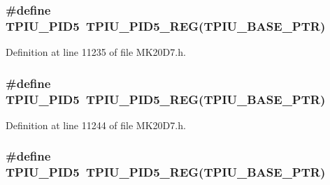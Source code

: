\subsubsection[{\texorpdfstring{T\+P\+I\+U\+\_\+\+P\+I\+D5}{TPIU_PID5}}]{\setlength{\rightskip}{0pt plus 5cm}\#define T\+P\+I\+U\+\_\+\+P\+I\+D5~{\bf T\+P\+I\+U\+\_\+\+P\+I\+D5\+\_\+\+R\+EG}({\bf T\+P\+I\+U\+\_\+\+B\+A\+S\+E\+\_\+\+P\+TR})}\hypertarget{group___t_p_i_u___register___accessor___macros_ga804c0eac6d089ad5451d954313339c37}{}\label{group___t_p_i_u___register___accessor___macros_ga804c0eac6d089ad5451d954313339c37}


Definition at line 11235 of file M\+K20\+D7.\+h.

\subsubsection[{\texorpdfstring{T\+P\+I\+U\+\_\+\+P\+I\+D5}{TPIU_PID5}}]{\setlength{\rightskip}{0pt plus 5cm}\#define T\+P\+I\+U\+\_\+\+P\+I\+D5~{\bf T\+P\+I\+U\+\_\+\+P\+I\+D5\+\_\+\+R\+EG}({\bf T\+P\+I\+U\+\_\+\+B\+A\+S\+E\+\_\+\+P\+TR})}\hypertarget{group___t_p_i_u___register___accessor___macros_ga804c0eac6d089ad5451d954313339c37}{}\label{group___t_p_i_u___register___accessor___macros_ga804c0eac6d089ad5451d954313339c37}


Definition at line 11244 of file M\+K20\+D7.\+h.

\subsubsection[{\texorpdfstring{T\+P\+I\+U\+\_\+\+P\+I\+D5}{TPIU_PID5}}]{\setlength{\rightskip}{0pt plus 5cm}\#define T\+P\+I\+U\+\_\+\+P\+I\+D5~{\bf T\+P\+I\+U\+\_\+\+P\+I\+D5\+\_\+\+R\+EG}({\bf T\+P\+I\+U\+\_\+\+B\+A\+S\+E\+\_\+\+P\+TR})}\hypertarget{group___t_p_i_u___register___accessor___macros_ga804c0eac6d089ad5451d954313339c37}{}\label{group___t_p_i_u___register___accessor___macros_ga804c0eac6d089ad5451d954313339c37}


